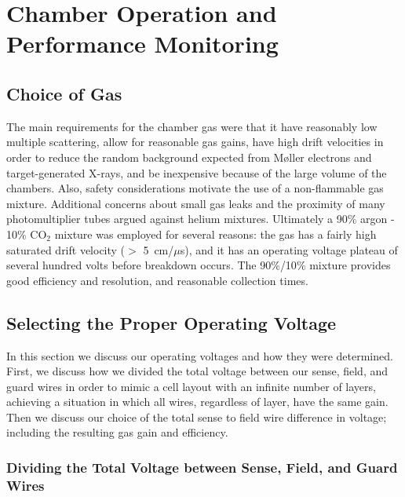 \section{Chamber Operation and Performance Monitoring}

\subsection{Choice of Gas}

The main requirements for the chamber gas were that it have reasonably low 
multiple scattering, allow for reasonable gas gains, have high drift velocities
in order to reduce the random background expected from M{\o}ller 
electrons and target-generated X-rays, and be inexpensive because of the 
large volume of the chambers. Also, safety considerations motivate the use of
a non-flammable gas mixture.  Additional concerns about small gas 
leaks and the proximity of many photomultiplier tubes argued against helium 
mixtures.  Ultimately a 90$\%$ argon - 10$\%$ CO$_2$ mixture was employed 
for several reasons: the gas has a fairly high saturated drift velocity 
($>$ 5~cm/$\mu$s), and it has an operating voltage plateau of several hundred 
volts before breakdown occurs.  The 90$\%$/10$\%$ mixture 
provides good efficiency and resolution, and reasonable collection times.

\subsection{Selecting the Proper Operating Voltage}

In this section we discuss our operating voltages and how they were determined.
First, we discuss how we divided the total voltage between our sense, field, 
and guard wires in order to mimic a cell layout with an infinite number of
layers, achieving a situation in which all wires, regardless of layer, have
the same gain.  Then we discuss our choice of the total sense to field
wire difference in voltage; including the resulting gas gain and efficiency.

\subsubsection{Dividing the Total Voltage between Sense, Field, and Guard Wires}

